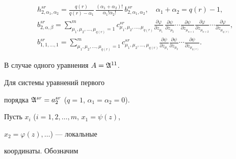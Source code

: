 \begin{align*}


&h^{sr}_{2,\alpha_1,\alpha_2}=


\frac{q(r)}{q(r)-\alpha_1}\,


\frac{(\alpha_1+\alpha_2)!}{\alpha_1!\alpha_2!}\,


b^{sr}_{2,\alpha_1,\alpha_2},\quad \alpha_1+\alpha_2=q(r)-1,\\


&b^{sr}_{2,\alpha,\beta}=


\sum^m_{\mu_1,\mu_2,\dotsc,\mu_{q(r)}=1}


c^{sr}_{\mu_1,\mu_2,\dotsc,\mu_{q(r)}}


\frac{\partial\varphi}{\partial z_{\mu_1}}\,


\frac{\partial\psi}{\partial z_{\mu_2}}\dotsb


\frac{\partial\psi}{\partial z_{\mu_{\alpha+1}}}


\frac{\partial\varphi}{\partial z_{\mu_{\alpha+2}}}\dotsb


\frac{\partial\varphi}{\partial z_{\mu_{q(r)}}},\\


%


&b^{sr}_{1,1,\dotsc,1}=


\sum^m_{\mu_1,\mu_2,\dotsc,\mu_{q(r)}=1}


c^{sr}_{\mu_1,\mu_2,\dotsc,\mu_{q(r)}}


\frac{\partial\psi}{\partial z_{\mu_1}}


\frac{\partial\psi}{\partial z_{\mu_2}}\dotsb


\frac{\partial\psi}{\partial z_{\mu_{q(r)}}}.


\end{align*}





В случае одного уравнения $A=\frak A^{11}$.


Для системы уравнений первого


порядка $\frak A^{sr}=a^{sr}_2$ ($q=1$, $\alpha_1=\alpha_2=0$).





Пусть $x_i$ ($i=1,2,\dotsc,m$, $x_1=\psi(z)$,


$x_2=\varphi(z),\dotsc$) --- локальные


координаты. Обозначим


